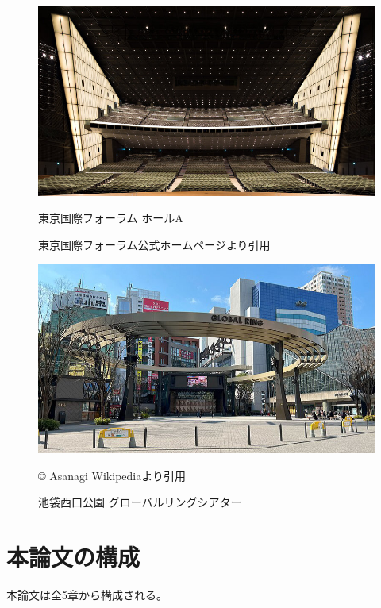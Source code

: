 \documentclass[11pt,a4j]{jreport}
\begin{document}
\begin{figure}[H]
  \begin{minipage}[t]{0.5\linewidth}
    \centering
    \includegraphics[width=0.9\linewidth]{images/pictureCitation/resized/tokyoForum.jpg}
    \caption{東京国際フォーラム ホールA}
    \footnotesize 東京国際フォーラム公式ホームページより引用 \cite{tokyoForum}
    \label{fig:東京国際フォーラム}
  \end{minipage}%
  \begin{minipage}[t]{0.5\linewidth}
    \centering
    \includegraphics[width=0.9\linewidth]{images/pictureCitation/resized/globalRing.jpg}
    \caption{池袋西口公園 グローバルリングシアター}
    \label{fig:グローバルリングシアター}
    \footnotesize © Asanagi Wikipediaより引用 \cite{globalRing}
  \end{minipage}
\end{figure}


\newpage
\section{本論文の構成} %
本論文は全5章から構成される。
\end{document}
